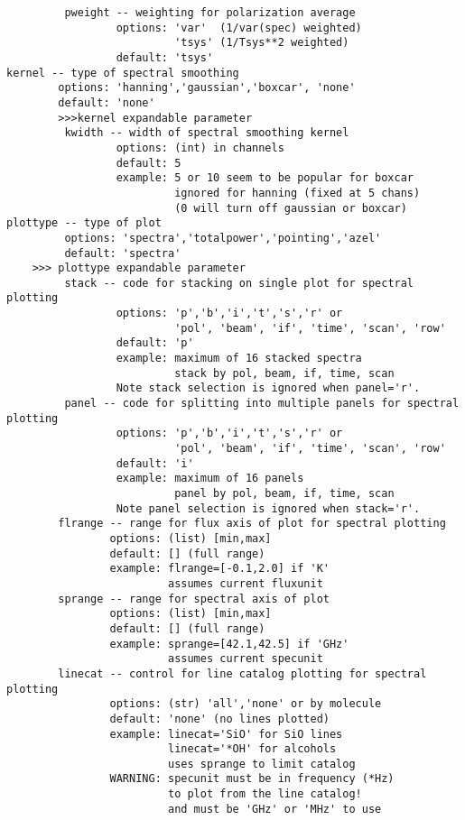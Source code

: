 \begin{verbatim}
         pweight -- weighting for polarization average
                 options: 'var'  (1/var(spec) weighted)
                          'tsys' (1/Tsys**2 weighted)
                 default: 'tsys'
kernel -- type of spectral smoothing
        options: 'hanning','gaussian','boxcar', 'none'
        default: 'none'
        >>>kernel expandable parameter
         kwidth -- width of spectral smoothing kernel
                 options: (int) in channels
                 default: 5
                 example: 5 or 10 seem to be popular for boxcar
                          ignored for hanning (fixed at 5 chans)
                          (0 will turn off gaussian or boxcar)
plottype -- type of plot
         options: 'spectra','totalpower','pointing','azel'
         default: 'spectra'
    >>> plottype expandable parameter
         stack -- code for stacking on single plot for spectral plotting
                 options: 'p','b','i','t','s','r' or
                          'pol', 'beam', 'if', 'time', 'scan', 'row'
                 default: 'p'
                 example: maximum of 16 stacked spectra
                          stack by pol, beam, if, time, scan
                 Note stack selection is ignored when panel='r'.
         panel -- code for splitting into multiple panels for spectral plotting
                 options: 'p','b','i','t','s','r' or
                          'pol', 'beam', 'if', 'time', 'scan', 'row'
                 default: 'i'
                 example: maximum of 16 panels
                          panel by pol, beam, if, time, scan
                 Note panel selection is ignored when stack='r'.
        flrange -- range for flux axis of plot for spectral plotting
                options: (list) [min,max]
                default: [] (full range)
                example: flrange=[-0.1,2.0] if 'K'
                         assumes current fluxunit
        sprange -- range for spectral axis of plot
                options: (list) [min,max]
                default: [] (full range)
                example: sprange=[42.1,42.5] if 'GHz'
                         assumes current specunit
        linecat -- control for line catalog plotting for spectral plotting
                options: (str) 'all','none' or by molecule
                default: 'none' (no lines plotted)
                example: linecat='SiO' for SiO lines
                         linecat='*OH' for alcohols
                         uses sprange to limit catalog
                WARNING: specunit must be in frequency (*Hz)
                         to plot from the line catalog!
                         and must be 'GHz' or 'MHz' to use

\end{verbatim}
